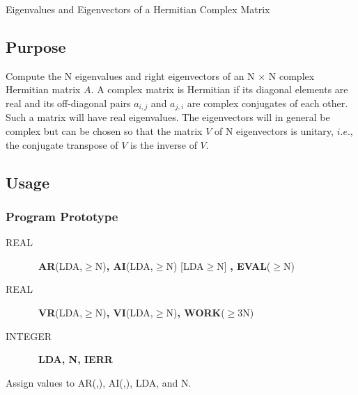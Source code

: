 \documentclass[twoside]{MATH77}
\begin{document}
 Eigenvalues and Eigenvectors of a Hermitian Complex Matrix


\subsection{Purpose}

Compute the N eigenvalues and right eigenvectors of an N $\times $ N
complex Hermitian matrix $A$. A complex matrix is Hermitian if its
diagonal elements are real and its off-diagonal pairs $a_{i,j}$ and
$a_{j,i}$ are complex conjugates of each other. Such a matrix will
have real eigenvalues. The eigenvectors will in general be complex
but can be chosen so that the matrix $V$ of N eigenvectors is
unitary, $i.e.$, the conjugate transpose of $V$ is the inverse of
$V$.

\subsection{Usage}

\subsubsection{Program Prototype}

\begin{description}
\item[REAL]  \ {\bf AR}(LDA,$\geq $N){\bf , AI}(LDA,$\geq $N) [LDA$\geq $N]
{\bf ,\newline
EVAL}($\geq $N)

\item[REAL]  \ {\bf VR}(LDA,$\geq $N){\bf , VI}(LDA,$\geq $N){\bf , WORK}($%
\geq $3N)

\item[INTEGER]  \ {\bf LDA, N, IERR}
\end{description}

Assign values to AR(,), AI(,), LDA, and N.

\begin{center}
\end{center}
\end{document}
